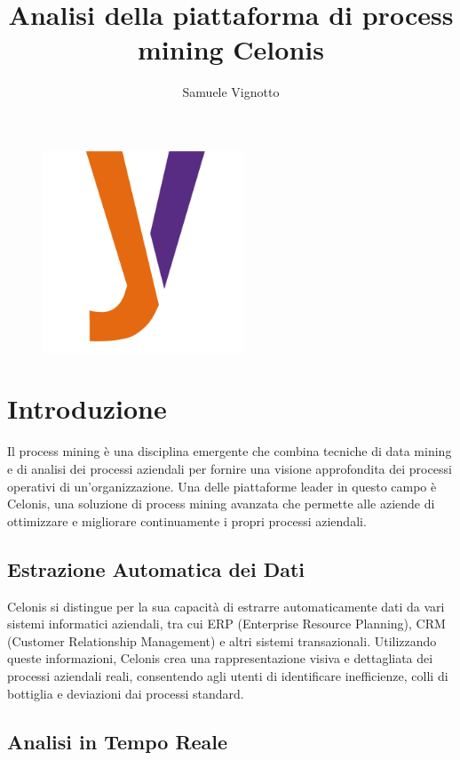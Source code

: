 \documentclass{article}
\title{\Huge{\textbf{Analisi della piattaforma di process mining Celonis}}\vspace{-1em}}
\author{Samuele Vignotto}
\date{}
\begin{document}
\maketitle
\begin{figure}[h]
  \centering
  \includegraphics[width=6cm, height=6cm]{Logo/Y_LOGO-SOLO.png}
  \label{fig:immagine}
\end{figure}

\newpage
\tableofcontents
\newpage

\section{Introduzione}

Il process mining è una disciplina emergente che combina tecniche di data mining e di analisi dei processi aziendali per fornire una visione approfondita dei processi operativi di un'organizzazione. Una delle piattaforme leader in questo campo è Celonis, una soluzione di process mining avanzata che permette alle aziende di ottimizzare e migliorare continuamente i propri processi aziendali.

\subsection{Estrazione Automatica dei Dati}

Celonis si distingue per la sua capacità di estrarre automaticamente dati da vari sistemi informatici aziendali, tra cui ERP (Enterprise Resource Planning), CRM (Customer Relationship Management) e altri sistemi transazionali. Utilizzando queste informazioni, Celonis crea una rappresentazione visiva e dettagliata dei processi aziendali reali, consentendo agli utenti di identificare inefficienze, colli di bottiglia e deviazioni dai processi standard.

\subsection{Analisi in Tempo Reale}
\end{document}
